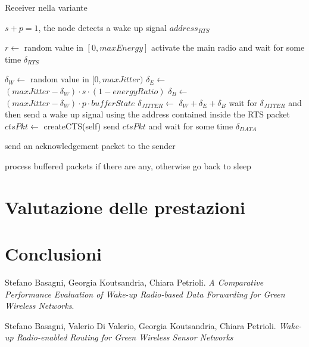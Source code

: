 \documentclass[binding=0.6cm,TFA]{sapthesis}
\begin{document}
\begin{algorithm}
    \caption{Receiver nella variante}
    \begin{algorithmic}
        \REQUIRE $s+p=1$, the node detects a wake up signal $address_{RTS}$

            \STATE $r \leftarrow$ random value in $[0,maxEnergy]$
                \STATE activate the main radio and wait for some time $\delta_{RTS}$


                    \STATE $\delta_{W} \leftarrow$ random value in $[0,maxJitter)$
                    \STATE $\delta_{E} \leftarrow$ $(maxJitter-\delta_{W}) \cdot s \cdot (1 - energyRatio)$
                    \STATE $\delta_{B} \leftarrow$ $(maxJitter-\delta_{W}) \cdot p \cdot bufferState$
                    \STATE $\delta_{JITTER} \leftarrow$ $\delta_{W} + \delta_{E} + \delta_{B}$
                    \STATE wait for $\delta_{JITTER}$ and then send a wake up signal using the address contained inside the RTS packet
                    \STATE $ctsPkt \leftarrow$ createCTS(self)
                    \STATE send $ctsPkt$ and wait for some time $\delta_{DATA}$

                        \STATE send an acknowledgement packet to the sender
                    \ENDIF
                \ENDIF

                \STATE process buffered packets if there are any, otherwise go back to sleep
            \ENDIF
        
    \end{algorithmic}
\end{algorithm}

\chapter{Valutazione delle prestazioni}
\chapter{Conclusioni}

\backmatter
\cleardoublepage
{} %

\begin{thebibliography}{9}

    Stefano Basagni, Georgia Koutsandria, Chiara Petrioli.
    \textit{A Comparative Performance Evaluation of Wake-up Radio-based Data Forwarding for Green Wireless Networks}.

    Stefano Basagni, Valerio Di Valerio, Georgia Koutsandria, Chiara Petrioli.
    \textit{Wake-up Radio-enabled Routing for Green Wireless Sensor Networks}
\end{thebibliography}
\end{document}
